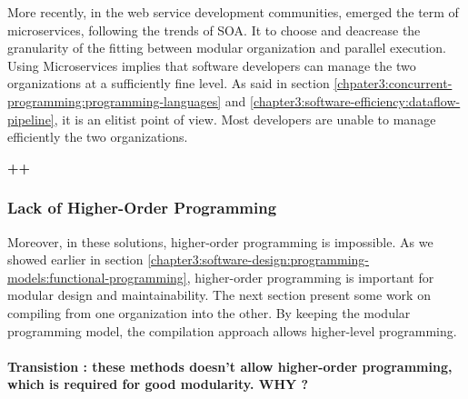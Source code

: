 More recently, in the web service development communities, emerged the term of microservices, following the trends of SOA.
It to choose and deacrease the granularity of the fitting between modular organization and parallel execution.
Using Microservices implies that software developers can manage the two organizations at a sufficiently fine level.
As said in section \ref{chpater3:concurrent-programming:programming-languages} and \ref{chapter3:software-efficiency:dataflow-pipeline}, it is an elitist point of view.
Most developers are unable to manage efficiently the two organizations.

\textbf{++}


\subsubsection{Lack of Higher-Order Programming}

Moreover, in these solutions, higher-order programming is impossible.
As we showed earlier in section \ref{chapter3:software-design:programming-models:functional-programming}, higher-order programming is important for modular design and maintainability.
The next section present some work on compiling from one organization into the other.
By keeping the modular programming model, the compilation approach allows higher-level programming. 

\paragraph{Transistion : these methods doesn't allow higher-order programming, which is required for good modularity. WHY ?}


\endinput

\subsection{Concurrency Theory} \label{chapter3:parallel-execution:concurrency-theory}

The mathematical models are a ground for all following work on concurrent programming, we briefly explain them in the next paragraphs.
There are two main formal models for concurrent computations.
The Actor Model of C. Hewitt and the Pi-calculus of R. Milner.
Based on these definitions, we explain the importance of determinism for correctness, and the reasons that made asynchronous message-passing prevail.


